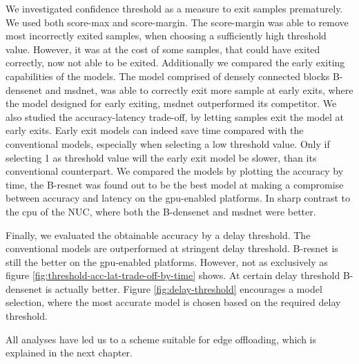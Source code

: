 We investigated confidence threshold as a measure to exit samples prematurely. We used both score-max and score-margin. The score-margin was able to remove most incorrectly exited samples, when choosing a sufficiently high threshold value. However, it was at the cost of some samples, that could have exited correctly, now not able to be exited. Additionally we compared the early exiting capabilities of the models. The model comprised of densely connected blocks B-\gls{densenet} and \gls{msdnet}, was able to correctly exit more sample at early exits, where the model designed for early exiting, \gls{msdnet} outperformed its competitor. We also studied the accuracy-latency trade-off, by letting samples exit the model at early exits. Early exit models can indeed save time compared with the conventional models, especially when selecting a low threshold value. Only if selecting 1 as threshold value will the early exit model be slower, than its conventional counterpart. We compared the models by plotting the accuracy by time, the B-\gls{resnet} was found out to be the best model at making a compromise between accuracy and latency on the \gls{gpu}-enabled platforms. In sharp contrast to the \gls{cpu} of the NUC, where both the B-\gls{densenet} and \gls{msdnet} were better.

Finally, we evaluated the obtainable accuracy by a delay threshold. The conventional models are outperformed at stringent delay threshold. B-\gls{resnet} is still the better on the \gls{gpu}-enabled platforms. However, not as exclusively as figure \ref{fig:threshold-acc-lat-trade-off-by-time} shows. At certain delay threshold B-\gls{densenet} is actually better. Figure \ref{fig:delay-threshold} encourages a model selection, where the most accurate model is chosen based on the required delay threshold. 

All analyses have led us to a scheme suitable for edge offloading, which is explained in the next chapter.

